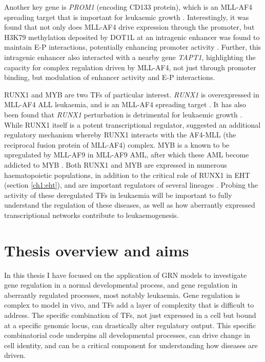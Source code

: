 Another key gene is \textit{PROM1} (encoding CD133 protein), which is an MLL-AF4 spreading target that is important for leukaemic growth \citep{kerry_mll-af4_2017, mak_mixed_2012, godfrey_h3k79me23_2021}. Interestingly, it was found that not only does MLL-AF4 drive expression through the promoter, but H3K79 methylation deposited by DOT1L at an intragenic enhancer was found to maintain E-P interactions, potentially enhancing promoter activity \citep{godfrey_h3k79me23_2021}. Further, this intragenic enhancer also interacted with a nearby gene \textit{TAPT1}, highlighting the capacity for complex regulation driven by MLL-AF4, not just through promoter binding, but modulation of enhancer activity and E-P interactions.

RUNX1 and MYB are two TFs of particular interest. \textit{RUNX1} is overexpressed in MLL-AF4 ALL leukaemia, and is an MLL-AF4 spreading target \citep{wilkinson_runx1_2013, kerry_mll-af4_2017}. It has also been found that \textit{RUNX1} perturbation is detrimental for leukaemic growth \citep{wilkinson_runx1_2013}. While RUNX1 itself is a potent transcriptional regulator, \cite{wilkinson_runx1_2013} suggested an additional regulatory mechanism whereby RUNX1 interacts with the AF4-MLL (the reciprocal fusion protein of MLL-AF4) complex. MYB is a known to be upregulated by MLL-AF9 in MLL-AF9 AML, after which these AML become addicted to MYB \citep{zuber_integrated_2011}. Both RUNX1 and MYB are expressed in numerous haematopoietic populations, in addition to the critical role of RUNX1 in EHT (section \ref{ch1:eht}), and are important regulators of several lineages \citep{ichikawa_role_2013, wang_myb_2018}. Probing the activity of these deregulated TFs in leukaemia will be important to fully understand the regulation of these diseases, as well as how aberrantly expressed transcriptional networks contribute to leukaemogenesis.

\section{Thesis overview and aims}

In this thesis I have focused on the application of GRN models to investigate gene regulation in a normal developmental process, and gene regulation in aberrantly regulated processes, most notably leukaemia. Gene regulation is complex to model in vivo, and TFs add a layer of complexity that is difficult to address. The specific combination of TFs, not just expressed in a cell but bound at a specific genomic locus, can drastically alter regulatory output. This specific combinatorial code underpins all developmental processes, can drive change in cell identity, and can be a critical component for understanding how diseases are driven.

